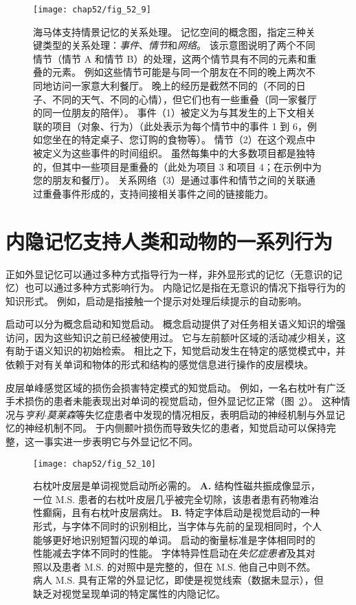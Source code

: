 \begin{figure}[htbp]
	\centering
	\texttt{[image: chap52/fig\_52\_9]}
	\caption{海马体支持情景记忆的关系处理。
		记忆空间的概念图，指定三种关键类型的关系处理：\textit{事件}、\textit{情节}和\textit{网络}。
		该示意图说明了两个不同情节（情节 A 和情节 B）的处理，这两个情节具有不同的元素和重叠的元素。
		例如这些情节可能是与同一个朋友在不同的晚上两次不同地访问一家意大利餐厅。
		晚上的经历是截然不同的（不同的日子、不同的天气、不同的心情），但它们也有一些重叠（同一家餐厅的同一位朋友的陪伴）。
		事件（1）被定义为与其发生的上下文相关联的项目（对象、行为）（此处表示为每个情节中的事件 1 到 6，例如您坐在的特定桌子、您订购的食物等）。
		情节（2）在这个观点中被定义为这些事件的时间组织。 虽然每集中的大多数项目都是独特的，但其中一些项目是重叠的（此处为项目 3 和项目 4；在示例中为您的朋友和餐厅）。
		关系网络（3）是通过事件和情节之间的关联通过重叠事件形成的，支持间接相关事件之间的链接能力\cite{eichenbaum2014can}。 }
	\label{fig:52_9}
\end{figure}



\section{内隐记忆支持人类和动物的一系列行为}

正如外显记忆可以通过多种方式指导行为一样，非外显形式的记忆（无意识的记忆）也可以通过多种方式影响行为。
内隐记忆是指在无意识的情况下指导行为的知识形式。
例如，启动是指接触一个提示对处理后续提示的自动影响。


启动可以分为概念启动和知觉启动。
概念启动提供了对任务相关语义知识的增强访问，因为这些知识之前已经被使用过。
它与左前额叶区域的活动减少相关，这有助于语义知识的初始检索。
相比之下，知觉启动发生在特定的感觉模式中，并依赖于对有关单词和物体的形式和结构的感觉信息进行操作的皮层模块。


皮层单峰感觉区域的损伤会损害特定模式的知觉启动。
例如，一名右枕叶有广泛手术损伤的患者未能表现出对单词的视觉启动，但外显记忆正常（图~\ref{fig:52_10}）。
这种情况与\textit{亨利$\cdot$莫莱森}等失忆症患者中发现的情况相反，表明启动的神经机制与外显记忆的神经机制不同。
于内侧颞叶损伤而导致失忆的患者，知觉启动可以保持完整，这一事实进一步表明它与外显记忆不同。


\begin{figure}[htbp]
	\centering
	\texttt{[image: chap52/fig\_52\_10]}
	\caption{右枕叶皮层是单词视觉启动所必需的\cite{vaidya1998font}。
		\textbf{A.} 结构性磁共振成像显示，一位 M.S. 患者的右枕叶皮层几乎被完全切除，该患者患有药物难治性癫痫，且有右枕叶皮层病灶。
		\textbf{B.} 特定字体启动是视觉启动的一种形式，与字体不同时的识别相比，当字体与先前的呈现相同时，个人能够更好地识别短暂闪现的单词。
		启动的衡量标准是字体相同时的性能减去字体不同时的性能。
		字体特异性启动在\textit{失忆症患者}及其对照以及患者 M.S. 的对照中是完整的，但在 M.S. 他自己中则不然。
		病人 M.S. 具有正常的外显记忆，即使是视觉线索（数据未显示），但缺乏对视觉呈现单词的特定属性的内隐记忆。}
	\label{fig:52_10}
\end{figure}



